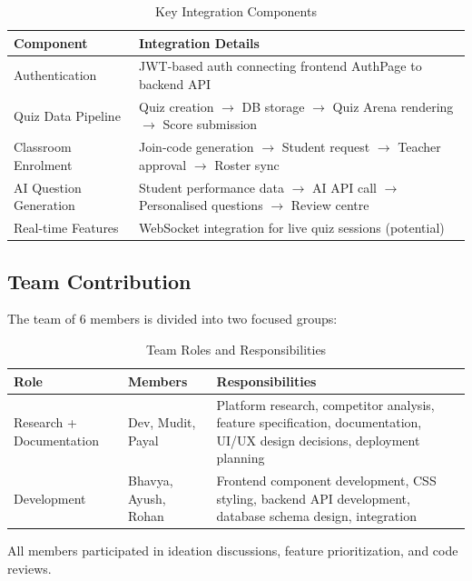 \documentclass[12pt,a4paper]{article}
\begin{document}
\begin{table}[H]
  \centering
  \caption{Key Integration Components}
  \small
  \begin{tabularx}{\linewidth}{@{} l X @{}}
    \toprule
    \textbf{Component} & \textbf{Integration Details} \\
    \midrule
    Authentication         & JWT-based auth connecting frontend AuthPage to backend API \\
    Quiz Data Pipeline     & Quiz creation $\to$ DB storage $\to$ Quiz Arena rendering $\to$ Score submission \\
    Classroom Enrolment    & Join-code generation $\to$ Student request $\to$ Teacher approval $\to$ Roster sync \\
    AI Question Generation & Student performance data $\to$ AI API call $\to$ Personalised questions $\to$ Review centre \\
    Real-time Features     & WebSocket integration for live quiz sessions (potential) \\
    \bottomrule
  \end{tabularx}
\end{table}

\subsection{Team Contribution}

The team of 6 members is divided into two focused groups:

\begin{table}[H]
  \centering
  \caption{Team Roles and Responsibilities}
  \small
  \begin{tabularx}{\linewidth}{@{} l l X @{}}
    \toprule
    \textbf{Role} & \textbf{Members} & \textbf{Responsibilities} \\
    \midrule
    Research + Documentation & Dev, Mudit, Payal & Platform research, competitor analysis, feature specification, documentation, UI/UX design decisions, deployment planning \\
    Development              & Bhavya, Ayush, Rohan & Frontend component development, CSS styling, backend API development, database schema design, integration \\
    \bottomrule
  \end{tabularx}
\end{table}

\begin{infobox}
  All members participated in ideation discussions, feature prioritization, and
  code reviews.
\end{infobox}
\end{document}
